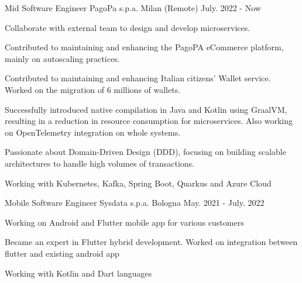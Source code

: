 


\begin{cventries}


\cventry
{Mid Software Engineer} %
{PagoPa s.p.a.} %
{Milan (Remote)} %
{July. 2022 - Now} %
{ %
\begin{cvitems}
\item { Collaborate with external team to design and develop microservices. }
\item { Contributed to maintaining and enhancing the PagoPA eCommerce platform, mainly on autoscaling practices. }
\item { Contributed to maintaining and enhancing Italian citizens' Wallet service. Worked on the migration of 6 millions of wallets. }
\item {Successfully introduced native compilation in Java and Kotlin using GraalVM, resulting in a reduction in resource consumption for microservices. Also working on OpenTelemetry integration on whole systems. }
\item {Passionate about Domain-Driven Design (DDD), focusing on building scalable architectures to handle high volumes of transactions.}
\item { Working with Kubernetes, Kafka, Spring Boot, Quarkus and Azure Cloud }
\end{cvitems}
}


\cventry
{Mobile Software Engineer} %
{Sysdata s.p.a.} %
{Bologna} %
{May. 2021 - July. 2022} %
{ %
\begin{cvitems}
\item {Working on Android and Flutter mobile app for various customers}
\item {Became an expert in Flutter hybrid development. Worked on integration between flutter and existing android app}
\item {Working with Kotlin and Dart languages}
\end{cvitems}
}


\end{cventries}